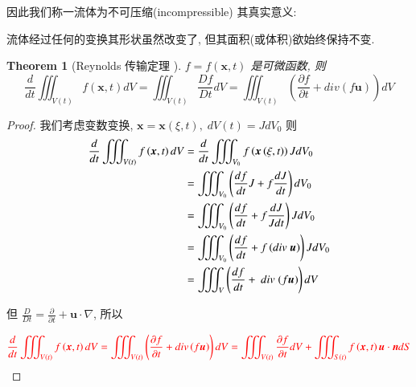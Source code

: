 \documentclass[11pt]{article}
\newtheorem{theorem}{Theorem}[subsection]
\begin{document}
因此我们称一流体为不可压缩(incompressible) 其真实意义:

流体经过任何的变换其形状虽然改变了, 但其面积(或体积)欲始终保持不变. 

\begin{theorem}[\kaishu Reynolds 传输定理 \uppercase\expandafter{}]
	$f = f\left( {\boldsymbol{x},t} \right)$ 是可微函数, 则
	\begin{equation}
	\frac{d}{{dt}}\iiint_{V\left( t \right)} {f\left( {\boldsymbol{x},t} \right)dV} = \iiint_{V\left( t \right)} {\frac{{Df}}{{Dt}}dV = \iiint_{V\left( t \right)} {\left( {\frac{{\partial f}}{{\partial t}} + div\left( {f\boldsymbol{u}} \right)} \right)dV}}
	\label{eq5.2.5}
	\end{equation}
\end{theorem}

\begin{proof}
	\kaishu 我们考虑变数变换, $\boldsymbol{x} = \boldsymbol{x}\left( {\xi ,t} \right),\;dV\left( t \right) = Jd{V_0}$ 则
	\begin{equation}
	\begin{split}
	\frac{d}{{dt}}\iiint_{V\left( t \right)} {f\left( {\boldsymbol{x},t} \right)dV} & = \frac{d}{{dt}}\iiint_{{V_0}} {f\left( {\boldsymbol{x}\left( {\xi ,t} \right)} \right)Jd{V_0}}\\
																					& = \iiint_{{V_0}} {\left( {\frac{{df}}{{dt}}J + f\frac{{dJ}}{{dt}}} \right)d{V_0}}\\
																					& = \iiint_{{V_0}} {\left( {\frac{{df}}{{dt}} + f\frac{{dJ}}{{Jdt}}} \right)Jd{V_0}}\\
																					& = \iiint_{{V_0}} {\left( {\frac{{df}}{{dt}} + f\left( {div\;\boldsymbol{u}} \right)} \right)Jd{V_0}}\\
																					& = \iiint_V {\left( {\frac{{df}}{{dt}} + \ div\;(f\boldsymbol{u})} \right) dV}
	\end{split}
	\notag 
	\end{equation}
	
	但 $\frac{D}{{Dt}} = \frac{\partial }{{\partial t}} + \boldsymbol{u} \cdot \nabla $, 所以
	
	\begin{equation}
	\color{red}
	\begin{split}
	\frac{d}{{dt}}\iiint_{V\left( t \right)} {f\left( {\boldsymbol{x},t} \right)dV}  = \iiint_{V\left( t \right)} {\left( {\frac{{\partial f}}{{\partial t}} + div\left( {f\boldsymbol{u}} \right)} \right)dV} = \iiint_{V\left( t \right)} {\frac{{\partial f}}{{\partial t}}dV} + \iiint_{S\left( t \right)} {f\left( {\boldsymbol{x},t} \right)\boldsymbol{u} \cdot \boldsymbol{n}dS}
	\end{split}
	\notag 
	\end{equation}
	
\end{proof}
\end{document}
